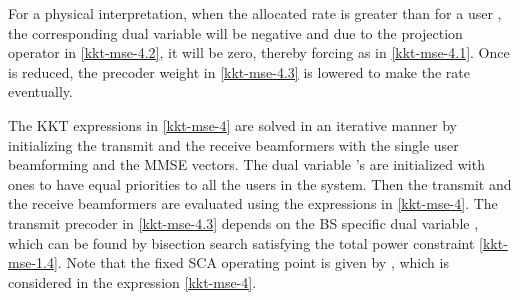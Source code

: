 For a physical interpretation, when the allocated rate  is greater than  for a user , the corresponding dual variable  will be negative and due to the projection operator \me{[x]^+} in \eqref{kkt-mse-4.2}, it will be zero, thereby forcing  as in \eqref{kkt-mse-4.1}. Once  is reduced, the precoder weight in \eqref{kkt-mse-4.3} is lowered to make the rate  eventually. 

The \ac{KKT} expressions in \eqref{kkt-mse-4} are solved in an iterative manner by initializing the transmit and the receive beamformers  with the single user beamforming and the \ac{MMSE} vectors. The dual variable \me{\alpha}'s are initialized with ones to have equal priorities to all the users in the system. Then the transmit and the receive beamformers are evaluated using the expressions in \eqref{kkt-mse-4}. The transmit precoder in \eqref{kkt-mse-4.3} depends on the \ac{BS} specific dual variable , which can be found by bisection search satisfying the total power constraint \eqref{kkt-mse-1.4}. Note that the fixed \ac{SCA} operating point is given by , which is considered in the expression \eqref{kkt-mse-4}.

